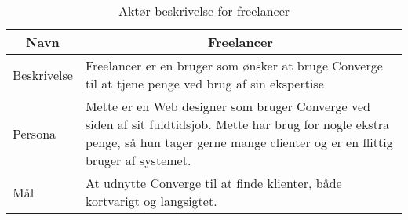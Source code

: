 \begin{table}[H]
    \begin{small}
        \caption{Aktør beskrivelse for freelancer}
        \label{tab:freelancer}
        \begin{center}
            \begin{tabular}[c]{p{3cm}|p{8cm}}
                \multicolumn{1}{c|}{\textbf{Navn}} & \multicolumn{1}{c}{\textbf{Freelancer}}                                                                                                                                                                            \\
                \hline
                Beskrivelse                        & \multicolumn{1}{p{10cm}}{Freelancer er en bruger som ønsker at bruge Converge til at tjene penge ved brug af sin ekspertise}                                                                                       \\
                \hline
                Persona                            & \multicolumn{1}{p{10cm}}{Mette er en Web designer som bruger Converge ved siden af sit fuldtidsjob. Mette har brug for nogle ekstra penge, så hun tager gerne mange clienter og er en flittig bruger af systemet.} \\
                \hline
                Mål                                & \multicolumn{1}{p{10cm}}{At udnytte Converge til at finde klienter, både kortvarigt og langsigtet.}                                                                                                                \\
            \end{tabular}
        \end{center}
    \end{small}
\end{table}

